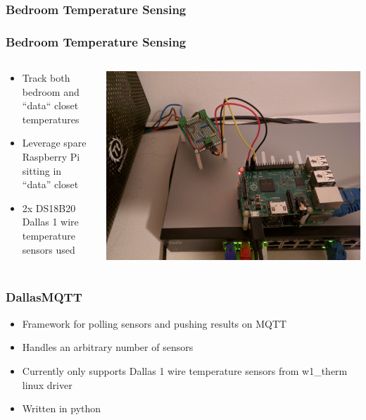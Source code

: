 \documentclass[aspectratio=169,11pt,hyperref={colorlinks=true}]{beamer}
\begin{document}
\subsubsection{Bedroom Temperature Sensing}
\begin{frame}
    \frametitle{Bedroom Temperature Sensing}
    \begin{columns}[T]
        \begin{column}{.48\textwidth}
            \begin{itemize}
                \item Track both bedroom and ``data`` closet temperatures
                \item Leverage spare Raspberry Pi sitting in ``data'' closet
                \item 2x DS18B20 Dallas 1 wire temperature sensors used
            \end{itemize}
        \end{column}
        \begin{column}{.48\textwidth}
            \centering
            \includegraphics[width=\textwidth]{raspi.jpg}
        \end{column}
    \end{columns}
\end{frame}

\begin{frame}
    \frametitle{DallasMQTT}
    \begin{itemize}
        \item Framework for polling sensors and pushing results on MQTT
        \item Handles an arbitrary number of sensors
        \item Currently only supports Dallas 1 wire temperature sensors from w1\_therm linux driver
        \item Written in python
    \end{itemize}
\end{frame}
\end{document}
